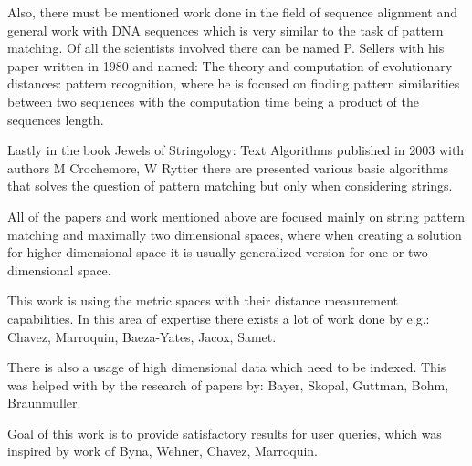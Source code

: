 Also, there must be mentioned work done in the field of sequence alignment and general work with DNA sequences which is very similar to the task of pattern matching. Of all the scientists involved there can be named P. Sellers with his paper written in 1980 and named: The theory and computation of evolutionary distances: pattern recognition, where he is focused on finding pattern similarities between two sequences with the computation time being a product of the sequences length.

Lastly in the book Jewels of Stringology: Text Algorithms published in 2003 with authors M Crochemore, W Rytter there are presented various basic algorithms that solves the question of pattern matching but only when considering strings.

All of the papers and work mentioned above are focused mainly on string pattern matching and maximally two dimensional spaces, where when creating a solution for higher dimensional space it is usually generalized version for one or two dimensional space.

This work is using the metric spaces with their distance measurement capabilities. In this area of expertise there exists a lot of work done by e.g.: Chavez, Marroquin, Baeza-Yates, Jacox, Samet.

There is also a usage of high dimensional data which need to be indexed. This was helped with by the research of papers by: Bayer, Skopal, Guttman, Bohm, Braunmuller.

Goal of this work is to provide satisfactory results for user queries, which was inspired by work of Byna, Wehner, Chavez, Marroquin.



